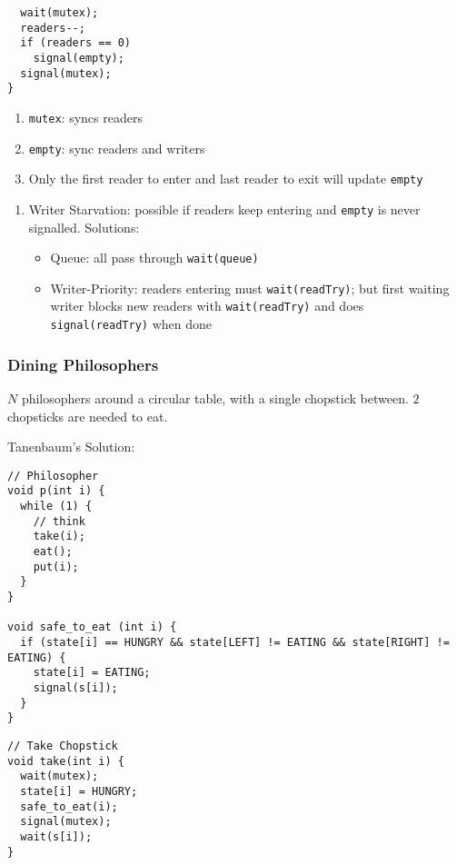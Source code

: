 \documentclass[12pt, a4paper]{article}
\begin{document}
\begin{multicols*}{3}
\begin{minipage}{0.5\columnwidth}
\begin{lstlisting}
  wait(mutex);
  readers--;
  if (readers == 0)
    signal(empty);
  signal(mutex);
}
  \end{lstlisting}
\end{minipage}
\begin{enumerate}[\roman*.]
  \item \lstinline|mutex|: syncs readers 
  \item \lstinline|empty|: sync readers and writers 
  \item Only the first reader to enter and last reader to exit will update \lstinline|empty|
\end{enumerate}\vspace{-1pt}
\begin{enumerate}[$-$]
  \item Writer Starvation: possible if readers keep entering and \lstinline|empty| is never signalled. Solutions:
    \begin{itemize}[leftmargin=*]\vspace{3pt}
      \item Queue: all pass through \lstinline|wait(queue)| 
      \item Writer-Priority: readers entering must \lstinline|wait(readTry)|; but first waiting writer blocks new readers with \lstinline|wait(readTry)| and does \lstinline|signal(readTry)| when done 
    \end{itemize}
\end{enumerate}
\colbreak
\subsubsection{Dining Philosophers}
$N$ philosophers around a circular table, with a single chopstick between. $2$ chopsticks are needed to eat.

Tanenbaum's Solution:\\
\begin{minipage}{0.48\columnwidth}
  \begin{lstlisting}
// Philosopher
void p(int i) {
  while (1) {
    // think
    take(i);
    eat();
    put(i);
  }
}

void safe_to_eat (int i) {
  if (state[i] == HUNGRY && state[LEFT] != EATING && state[RIGHT] != EATING) {
    state[i] = EATING;
    signal(s[i]);
  }
}
  \end{lstlisting}
\end{minipage}
\begin{minipage}{0.45\columnwidth}
  \begin{lstlisting}
// Take Chopstick
void take(int i) {
  wait(mutex);
  state[i] = HUNGRY;
  safe_to_eat(i);
  signal(mutex);
  wait(s[i]);
}


\end{lstlisting}
\end{minipage}
\end{multicols*}
\end{document}
